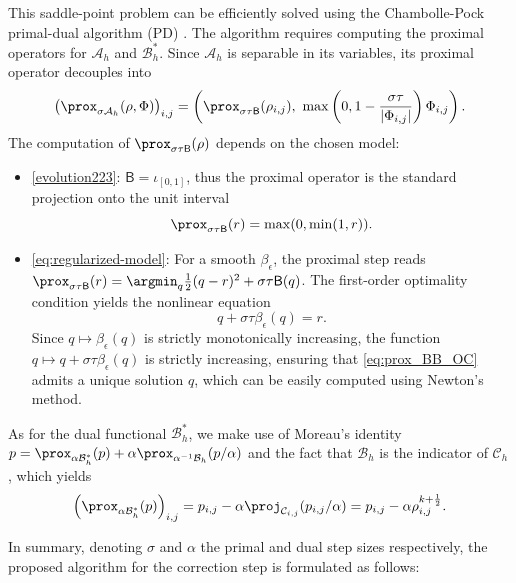 \documentclass[final,reqno]{amsart}
\theoremstyle{plain}
\theoremstyle{definition}
\theoremstyle{remark}
\numberwithin{remark}{section}	%
\numberwithin{example}{section}	%
\newcommand{\CC}{\mathcal C}
\newcommand{\A}{\mathcal A}
\newcommand{\B}{\mathcal B}
\newcommand{\BB}{\mathsf{B}}
\newcommand{\I}{\iota}
\begin{document}
This saddle-point problem can be efficiently solved using the Chambolle-Pock primal-dual algorithm (PD) \cite{chambolle2011first}. The algorithm requires computing the proximal operators for $\A_h$ and $\B_h^*$. Since $\A_h$ is separable in its variables, its proximal operator decouples into
\begin{equation}
    \label{eq:prox_F}
    \left(\prox_{\sigma\A_h}(\rho,\Phi)\right)_{i,j} = \left( \prox_{\sigma\tau\BB}(\rho_{i,j}), \ \max\left(0, 1 - \frac{\sigma\tau}{\vert\Phi_{i, j}\vert}\right)\Phi_{i, j} \right).
\end{equation}
The computation of $\prox_{\sigma\tau\BB}(\rho)$ depends on the chosen model:
\begin{itemize}
    \item\eqref{evolution223}: $\BB = \I_{[0,1]}$, thus the proximal operator is the standard projection onto the unit interval
    \[
     \prox_{\sigma\tau\BB}(r) = \max(0, \min(1, r)). 
    \]
    \item\eqref{eq:regularized-model}: For a smooth $\beta_\epsilon$, the proximal step reads $\prox_{\sigma\tau\BB}(r) = \argmin_{q} \frac{1}{2}(q-r)^2 + \sigma\tau\BB(q)$. The first-order optimality condition yields the nonlinear equation
    \begin{equation}\label{eq:prox_BB_OC}
        q + \sigma\tau\beta_{\epsilon}(q) = r.
    \end{equation}
    Since $q \mapsto \beta_{\epsilon}(q)$ is strictly monotonically increasing, the function $q \mapsto q+\sigma\tau\beta_{\epsilon}(q)$ is strictly increasing, ensuring that \eqref{eq:prox_BB_OC} admits a unique solution $q$, which can be easily computed using Newton's method.
\end{itemize}

As for the dual functional $\B_{h}^{*}$, we make use of Moreau's identity $p = \prox_{\alpha\B^*_h}(p) + \alpha\prox_{\alpha^{-1}\B_h}(p/\alpha)$ and the fact that $\B_h$ is the indicator of $\CC_h$, which yields
\begin{equation}
    \left(\prox_{\alpha\B^*_h}(p)\right)_{i,j} = p_{i,j} - \alpha\proj_{\CC_{i,j}}(p_{i,j}/\alpha) = p_{i,j} - \alpha \rho_{i,j}^{k+\frac{1}{2}}.
\end{equation}

In summary, denoting $\sigma$ and $\alpha$ the primal and dual step sizes respectively, the proposed algorithm for the correction step is formulated as follows:
\end{document}

